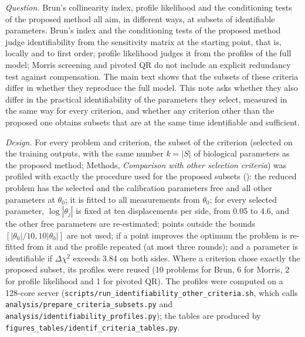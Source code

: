 

\emph{Question.} Brun's collinearity index, profile likelihood and the conditioning tests of the proposed method all aim, in different ways, at subsets of identifiable parameters. Brun's index and the conditioning tests of the proposed method judge identifiability from the sensitivity matrix at the starting point, that is, locally and to first order; profile likelihood judges it from the profiles of the full model; Morris screening and pivoted QR do not include an explicit redundancy test against compensation. The main text shows that the subsets of these criteria differ in whether they reproduce the full model. This note asks whether they also differ in the practical identifiability of the parameters they select, measured in the same way for every criterion, and whether any criterion other than the proposed one obtains subsets that are at the same time identifiable and sufficient.

\emph{Design.} For every problem and criterion, the subset of the criterion (selected on the training outputs, with the same number $k=|S|$ of biological parameters as the proposed method; Methods, \emph{Comparison with other selection criteria}) was profiled with exactly the procedure used for the proposed subsets (): the reduced problem has the selected and the calibration parameters free and all other parameters at $\theta_0$; it is fitted to all measurements from $\theta_0$; for every selected parameter, $\log|\theta_j|$ is fixed at ten displacements per side, from 0.05 to 4.6, and the other free parameters are re-estimated; points outside the bounds $[|\theta_0|/10,10|\theta_0|]$ are not used; if a point improves the optimum the problem is re-fitted from it and the profile repeated (at most three rounds); and a parameter is identifiable if $\Delta\chi^2$ exceeds 3.84 on both sides. Where a criterion chose exactly the proposed subset, its profiles were reused (10 problems for Brun, 6 for Morris, 2 for profile likelihood and 1 for pivoted QR). The profiles were computed on a 128-core server (\texttt{scripts/run\_identifiability\_other\_criteria.sh}, which calls \texttt{analysis/prepare\_criteria\_subsets.py} and \texttt{analysis/identifiability\_profiles.py}); the tables are produced by \texttt{figures\_tables/identif\_criteria\_tables.py}.

